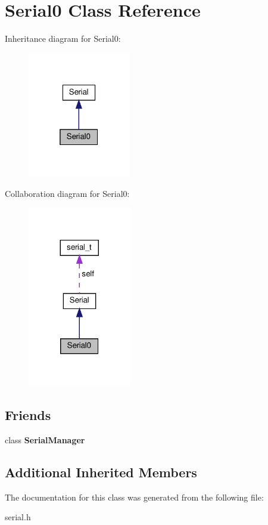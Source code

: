 \hypertarget{classSerial0}{}\section{Serial0 Class Reference}
\label{classSerial0}


Inheritance diagram for Serial0\+:\nopagebreak
\begin{figure}[H]
\begin{center}
\leavevmode
\includegraphics[width=127pt]{classSerial0__inherit__graph}
\end{center}
\end{figure}


Collaboration diagram for Serial0\+:\nopagebreak
\begin{figure}[H]
\begin{center}
\leavevmode
\includegraphics[width=128pt]{classSerial0__coll__graph}
\end{center}
\end{figure}
\subsection*{Friends}
\begin{DoxyCompactItemize}
\item 
\mbox{\label{classSerial0_ae711712f6bc003a5d1156a409a19941b}} 
class {\bfseries Serial\+Manager}
\end{DoxyCompactItemize}
\subsection*{Additional Inherited Members}


The documentation for this class was generated from the following file\+:\begin{DoxyCompactItemize}
\item 
serial.\+h\end{DoxyCompactItemize}
